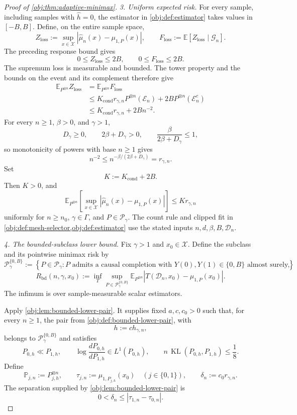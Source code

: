 \begin{proof}[Proof of \cref{obj:thm:adaptive-minimax}]
\emph{3. Uniform expected risk.}
For every sample, including samples with \(\widehat h=0\), the estimator in \cref{obj:def:estimator} takes values in \([-B,B]\). Define, on the entire sample space,
\[
Z_{\mathrm{loss}}
:=
\sup_{x\in\mathcal X}
|\widehat\mu_n(x)-\mu_{1,P}(x)|,
\qquad
F_{\mathrm{loss}}
:=
\mathbb E[Z_{\mathrm{loss}}\mid\mathcal G_n].
\]
The preceding response bound gives
\[
0\le Z_{\mathrm{loss}}\le2B,
\qquad
0\le F_{\mathrm{loss}}\le2B.
\]
The supremum loss is measurable and bounded. The tower property and the bounds on the event and its complement therefore give
\[
\begin{aligned}
\mathbb E_{P^{\otimes n}}Z_{\mathrm{loss}}
&=\mathbb E_{P^{\otimes n}}F_{\mathrm{loss}}
\\
&\le
K_{\mathrm{cond}}r_{\gamma,n}
P^{\otimes n}(\mathcal E_n)
+
2B P^{\otimes n}(\mathcal E_n^c)
\\
&\le K_{\mathrm{cond}}r_{\gamma,n}+2Bn^{-2}.
\end{aligned}
\]
For every \(n\ge1\), \(\beta>0\), and \(\gamma>1\),
\[
D_\gamma\ge0,
\qquad
2\beta+D_\gamma>0,
\qquad
\frac{\beta}{2\beta+D_\gamma}\le1,
\]
so monotonicity of powers with base \(n\ge1\) gives
\[
n^{-2}
\le n^{-\beta/(2\beta+D_\gamma)}
=r_{\gamma,n}.
\]
Set
\[
K:=K_{\mathrm{cond}}+2B.
\]
Then \(K>0\), and
\[
\mathbb E_{P^{\otimes n}}
\left[
\sup_{x\in\mathcal X}
|\widehat\mu_n(x)-\mu_{1,P}(x)|
\right]
\le Kr_{\gamma,n}
\]
uniformly for \(n\ge n_0\), \(\gamma\in\Gamma\), and \(P\in\mathcal P_\gamma\). The count rule and clipped fit in \cref{obj:def:mesh-selector,obj:def:estimator} use the stated inputs \(n,d,\beta,B,\mathcal D_n\).

\emph{4. The bounded-subclass lower bound.}
Fix \(\gamma>1\) and \(x_0\in\mathcal X\). Define the subclass and its pointwise minimax risk by
\[
\mathcal P_\gamma^{\{0,B\}}
:=
\left\{
P\in\mathcal P_\gamma:
P\text{ admits a causal completion with }
Y(0),Y(1)\in\{0,B\}\text{ almost surely}
\right\},
\]
\[
R_{\mathrm{bd}}(n,\gamma,x_0)
:=
\inf_T\sup_{P\in\mathcal P_\gamma^{\{0,B\}}}
\mathbb E_{P^{\otimes n}}
|T(\mathcal D_n,x_0)-\mu_{1,P}(x_0)|.
\]
The infimum is over sample-measurable scalar estimators.

Apply \cref{obj:lem:bounded-lower-pair}. It supplies fixed \(a,c,c_0>0\) such that, for every \(n\ge1\), the pair from \cref{obj:def:bounded-lower-pair}, with
\[
h:=ch_{\gamma,n},
\]
belongs to \(\mathcal P_\gamma^{\{0,B\}}\) and satisfies
\[
P_{0,h}\ll P_{1,h},
\qquad
\log\frac{dP_{0,h}}{dP_{1,h}}\in L^1(P_{0,h}),
\qquad
n\,\operatorname{KL}(P_{0,h},P_{1,h})\le\frac18.
\]
Define
\[
\mathbb P_{j,n}:=P_{j,h}^{\otimes n},
\qquad
\tau_{j,n}:=\mu_{1,P_{j,h}}(x_0)
\quad(j\in\{0,1\}),
\qquad
\delta_n:=c_0r_{\gamma,n}.
\]
The separation supplied by \cref{obj:lem:bounded-lower-pair} is
\[
0<\delta_n\le|\tau_{1,n}-\tau_{0,n}|.
\]


\end{proof}
